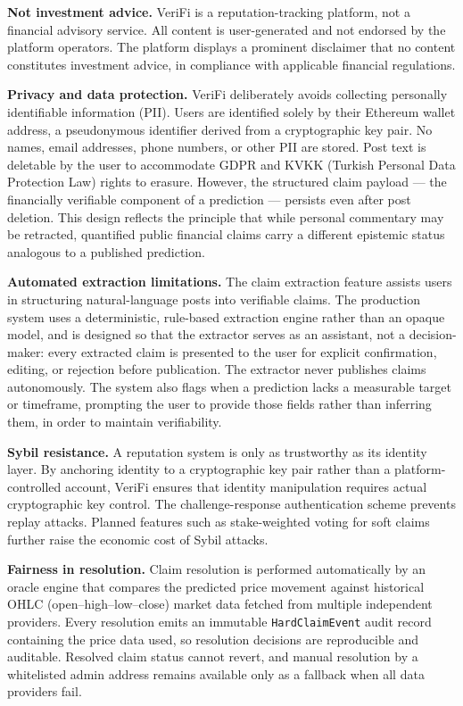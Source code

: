 \documentclass[a4paper,12pt]{report}
\begin{document}
\textbf{Not investment advice.} VeriFi is a reputation-tracking platform, not a financial advisory service. All content is user-generated and not endorsed by the platform operators. The platform displays a prominent disclaimer that no content constitutes investment advice, in compliance with applicable financial regulations.

\textbf{Privacy and data protection.} VeriFi deliberately avoids collecting personally identifiable information (PII). Users are identified solely by their Ethereum wallet address, a pseudonymous identifier derived from a cryptographic key pair. No names, email addresses, phone numbers, or other PII are stored. Post text is deletable by the user to accommodate GDPR and KVKK (Turkish Personal Data Protection Law) rights to erasure. However, the structured claim payload --- the financially verifiable component of a prediction --- persists even after post deletion. This design reflects the principle that while personal commentary may be retracted, quantified public financial claims carry a different epistemic status analogous to a published prediction.

\textbf{Automated extraction limitations.} The claim extraction feature assists users in structuring natural-language posts into verifiable claims. The production system uses a deterministic, rule-based extraction engine rather than an opaque model, and is designed so that the extractor serves as an assistant, not a decision-maker: every extracted claim is presented to the user for explicit confirmation, editing, or rejection before publication. The extractor never publishes claims autonomously. The system also flags when a prediction lacks a measurable target or timeframe, prompting the user to provide those fields rather than inferring them, in order to maintain verifiability.

\textbf{Sybil resistance.} A reputation system is only as trustworthy as its identity layer. By anchoring identity to a cryptographic key pair rather than a platform-controlled account, VeriFi ensures that identity manipulation requires actual cryptographic key control. The challenge-response authentication scheme prevents replay attacks. Planned features such as stake-weighted voting for soft claims further raise the economic cost of Sybil attacks.

\textbf{Fairness in resolution.} Claim resolution is performed automatically by an oracle engine that compares the predicted price movement against historical OHLC (open--high--low--close) market data fetched from multiple independent providers. Every resolution emits an immutable \texttt{HardClaimEvent} audit record containing the price data used, so resolution decisions are reproducible and auditable. Resolved claim status cannot revert, and manual resolution by a whitelisted admin address remains available only as a fallback when all data providers fail.
\end{document}
